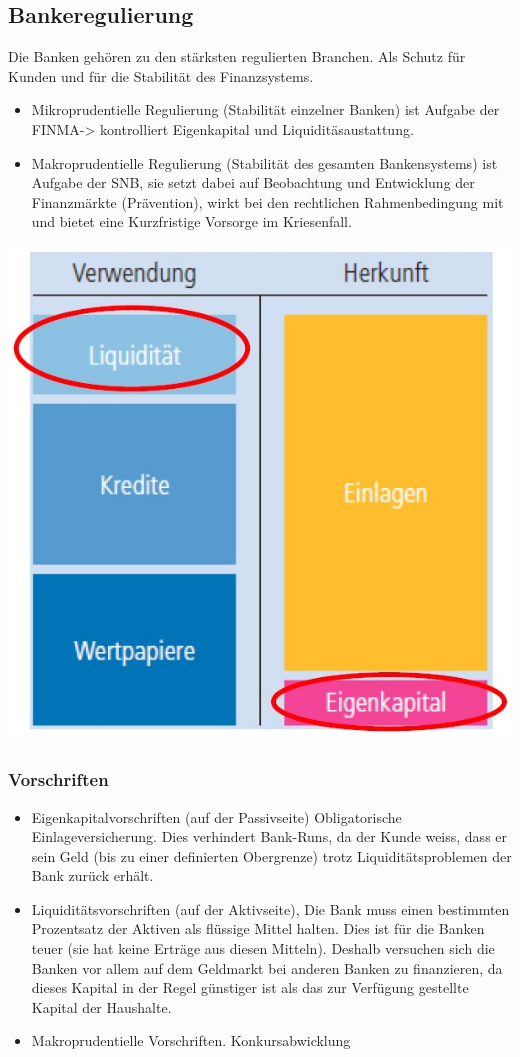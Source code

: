\subsection{Bankeregulierung}
Die Banken gehören zu den stärksten regulierten Branchen. Als Schutz für Kunden und für die Stabilität des Finanzsystems. 
\begin{itemize}
	\item Mikroprudentielle Regulierung (Stabilität einzelner Banken) ist Aufgabe der FINMA-> kontrolliert Eigenkapital und Liquiditäsaustattung.
	\item Makroprudentielle Regulierung (Stabilität des gesamten Bankensystems) ist Aufgabe der SNB, sie setzt dabei auf Beobachtung und Entwicklung der Finanzmärkte (Prävention), wirkt bei den rechtlichen Rahmenbedingung mit und bietet eine Kurzfristige Vorsorge im Kriesenfall.
\end{itemize}
\includegraphics[width=0.4\linewidth]{images/banken2.jpg}
\subsubsection{Vorschriften}
\begin{itemize}
	\item Eigenkapitalvorschriften (auf der Passivseite) Obligatorische Einlageversicherung. Dies verhindert Bank-Runs, da der Kunde weiss, dass er sein Geld (bis zu einer definierten Obergrenze) trotz Liquiditätsproblemen der Bank zurück erhält.
	\item Liquiditätsvorschriften (auf der Aktivseite), Die Bank muss einen bestimmten Prozentsatz der Aktiven als flüssige Mittel
	halten. Dies ist für die Banken teuer (sie hat keine Erträge aus diesen Mitteln). Deshalb versuchen sich die Banken vor allem auf dem Geldmarkt bei anderen Banken zu finanzieren, da dieses Kapital in der Regel günstiger ist als das zur Verfügung gestellte Kapital der Haushalte.
	\item Makroprudentielle Vorschriften. Konkursabwicklung
\end{itemize}
